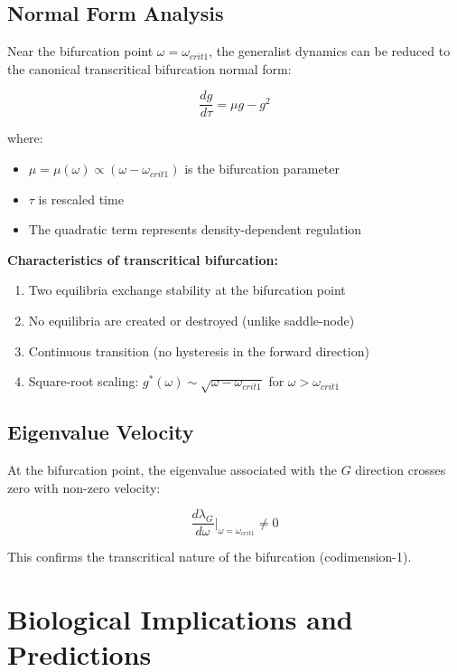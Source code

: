 \documentclass[11pt]{article}
\begin{document}
\subsection{Normal Form Analysis}

Near the bifurcation point $\omega = \omega_{crit1}$, the generalist dynamics can be reduced to the canonical transcritical bifurcation normal form:

\begin{equation}
\frac{dg}{d\tau} = \mu g - g^2
\end{equation}

where:
\begin{itemize}
    \item $\mu = \mu(\omega) \propto (\omega - \omega_{crit1})$ is the bifurcation parameter
    \item $\tau$ is rescaled time
    \item The quadratic term represents density-dependent regulation
\end{itemize}

\textbf{Characteristics of transcritical bifurcation:}
\begin{enumerate}
    \item Two equilibria exchange stability at the bifurcation point
    \item No equilibria are created or destroyed (unlike saddle-node)
    \item Continuous transition (no hysteresis in the forward direction)
    \item Square-root scaling: $g^*(\omega) \sim \sqrt{\omega - \omega_{crit1}}$ for $\omega > \omega_{crit1}$
\end{enumerate}

\subsection{Eigenvalue Velocity}

At the bifurcation point, the eigenvalue associated with the $G$ direction crosses zero with non-zero velocity:

\begin{equation}
\frac{d\lambda_G}{d\omega}\bigg|_{\omega = \omega_{crit1}} \neq 0
\end{equation}

This confirms the transcritical nature of the bifurcation (codimension-1).

\section{Biological Implications and Predictions}
\end{document}
